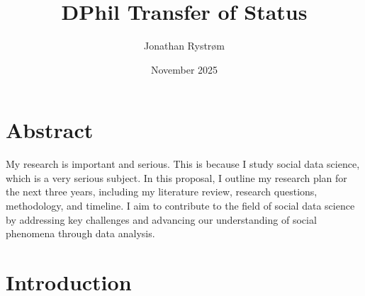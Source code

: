 \documentclass[a4paper,12pt, oneside]{book}
\title{DPhil Transfer of Status}
\author{Jonathan Rystrøm}
\date{November 2025}
\begin{document}

\onehalfspacing

\chapter*{Abstract}
My research is important and serious. This is because I study social data science, which is a very serious subject. 
In this proposal, I outline my research plan for the next three years, including my literature review, research questions, methodology, and timeline. 
I aim to contribute to the field of social data science by addressing key challenges and advancing our understanding of social phenomena through data analysis.


\setcounter{tocdepth}{1} %

\setlength{\cftbeforetoctitleskip}{0pt}
\setlength{\cftaftertoctitleskip}{18pt}


{
\setlength{\parskip}{0pt} 
\newpage
\tableofcontents
}

\chapter{Introduction}


\clearpage


\clearpage


\clearpage


\clearpage


\clearpage


\appendix




\newpage


\end{document}

